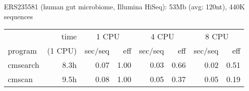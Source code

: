 \documentclass[landscape]{slides}
\begin{document}
\begin{slide}
\begin{center}

\medskip

\medskip

ERS235581 (human gut microbiome, Illumina HiSeq): 53Mb (avg: 120nt), 440K sequences

\begin{tabular}{l|r|rr|rr|rr}
         & time    & \multicolumn{2}{c}{1 CPU} & \multicolumn{2}{c}{4 CPU} & \multicolumn{2}{c}{8 CPU} \\ \cline{3-8}
program  & (1 CPU) & sec/seq & eff & sec/seq & eff & sec/seq & eff \\ \hline
cmsearch & 8.3h    & 0.07 & 1.00 &     0.03  & 0.66 &     0.02  & 0.51 \\
cmscan   & 9.5h    & 0.08 & 1.00 &     0.05  & 0.37 &     0.05  & 0.19 \\
\end{tabular}


%

\end{center}
\vfill
\end{slide}
\end{document}
